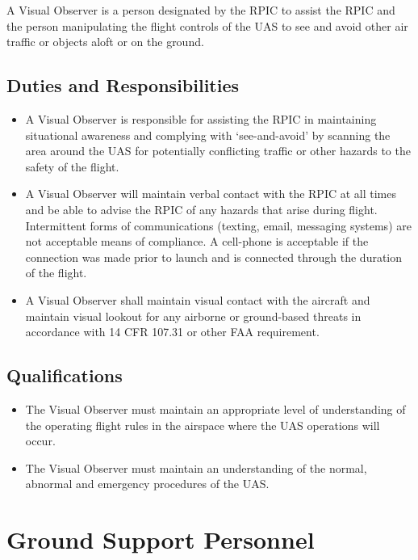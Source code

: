 \documentclass[
]{book}
\providecommand{\tightlist}{%
  \setlength{\itemsep}{0pt}\setlength{\parskip}{0pt}}
\begin{document}
A Visual Observer is a person designated by the RPIC to assist the RPIC and the person manipulating the flight controls of the UAS to see and avoid other air traffic or objects aloft or on the ground.

\hypertarget{duties-and-responsibilities-3}{%
\subsection{Duties and Responsibilities}\label{duties-and-responsibilities-3}}

\begin{itemize}
\tightlist
\item
  A Visual Observer is responsible for assisting the RPIC in maintaining situational awareness and complying with `see-and-avoid' by scanning the area around the UAS for potentially conflicting traffic or other hazards to the safety of the flight.
\item
  A Visual Observer will maintain verbal contact with the RPIC at all times and be able to advise the RPIC of any hazards that arise during flight. Intermittent forms of communications (texting, email, messaging systems) are not acceptable means of compliance. A cell-phone is acceptable if the connection was made prior to launch and is connected through the duration of the flight.
\item
  A Visual Observer shall maintain visual contact with the aircraft and maintain visual lookout for any airborne or ground-based threats in accordance with 14 CFR 107.31 or other FAA requirement.
\end{itemize}

\hypertarget{qualifications-1}{%
\subsection{Qualifications}\label{qualifications-1}}

\begin{itemize}
\tightlist
\item
  The Visual Observer must maintain an appropriate level of understanding of the operating flight rules in the airspace where the UAS operations will occur.
\item
  The Visual Observer must maintain an understanding of the normal, abnormal and emergency procedures of the UAS.
\end{itemize}

\hypertarget{ground-support-personnel}{%
\section{Ground Support Personnel}\label{ground-support-personnel}}
\end{document}
